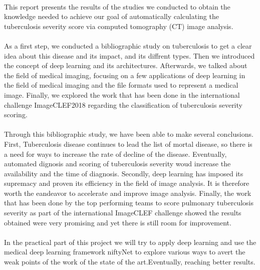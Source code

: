 \paragraph{}
This report presents the results of the studies we conducted to obtain the knowledge needed to achieve our goal of automatically calculating the tuberculosis severity score via computed tomography (CT) image analysis.
\paragraph{}
As a first step, we conducted a bibliographic study on tuberculosis to get a clear idea about this disease and its impact, and its diffrent types. Then we introduced the concept of deep learning and its architectures. Afterwards, we talked about the field of medical imaging, focusing on a few applications of deep learning in the field of medical imaging and the file formats used to represent a medical image. Finally, we explored the work that has been done in the international challenge ImageCLEF2018\cite{ImageCLEF:1} regarding the classification of tuberculosis severity scoring.
\paragraph{}
Through this bibliographic study, we have been able to make several conclusions. First, Tuberculosis disease continues to lead the list of mortal disease, so there is a need for ways to increase the rate of decline of the disease. Eventually, automated dignosis and scoring of tuberculosis severity woud increase the availability and the time of diagnosis. Secondly, deep learning has imposed its supremacy and proven its efficiency in the field of image analysis. It is therefore worth the eandeavor to accelerate and improve image analysis. Finally, the work that has been done by the top performing teams to score pulmonary tuberculosis severity as part of the international ImageCLEF challenge showed the results obtained were very promising and yet there is still room for improvement.
\paragraph{}
In the practical part of this project we will try to apply deep learning and use the medical deep learning framework niftyNet to explore various ways to avert the weak points of the work of the state of the art.Eventually, reaching better results. 

